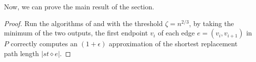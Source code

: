 Now, we can prove the main result of the section.

\apxUB*
\begin{proof}
Run the algorithms of  and  with the threshold $\zeta = n^{2/3}$, by taking the minimum of the two outputs, the first endpoint $v_i$ of each edge $e=(v_i, v_{i+1})$ in $P$ correctly computes an $(1+\epsilon)$ approximation of the shortest replacement path length $|st \diamond e|$.
\end{proof}
